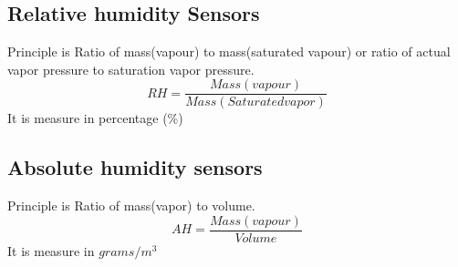 \documentclass[a4paper,12pt]{report}
\begin{document}
\subsection{Relative humidity Sensors}
Principle is Ratio of mass(vapour) to mass(saturated vapour) or ratio of actual vapor pressure to saturation vapor pressure.
$$ RH = \frac{Mass (vapour)}{Mass (Saturated vapor)}
$$
It is measure in percentage (\%)

\subsection{Absolute humidity sensors}
Principle is Ratio of mass(vapor) to volume.
$$ AH = \frac{Mass (vapour)}{Volume}
$$
It is measure in $ grams/m^3$
\newpage
\begin{landscape}
 

\end{landscape}
\end{document}

